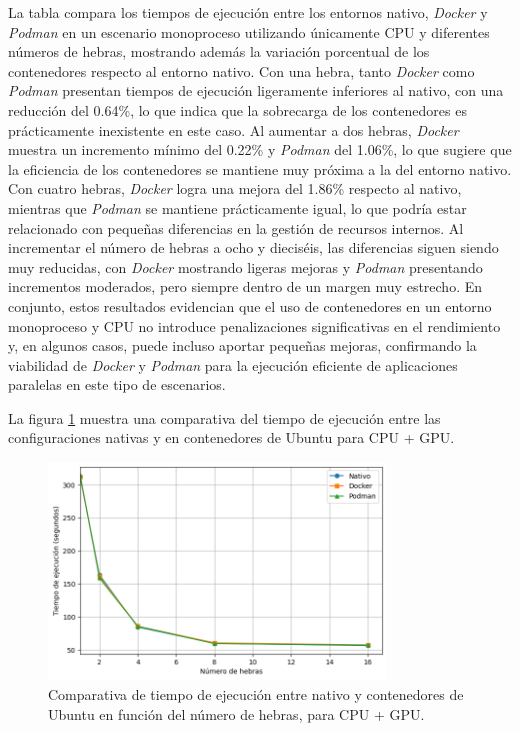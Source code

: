 La tabla compara los tiempos de ejecución entre los entornos nativo, \textit{Docker} y \textit{Podman} en un escenario monoproceso utilizando únicamente CPU y diferentes números de hebras, mostrando además la variación porcentual de los contenedores respecto al entorno nativo. Con una hebra, tanto \textit{Docker} como \textit{Podman} presentan tiempos de ejecución ligeramente inferiores al nativo, con una reducción del 0.64\%, lo que indica que la sobrecarga de los contenedores es prácticamente inexistente en este caso. Al aumentar a dos hebras, \textit{Docker} muestra un incremento mínimo del 0.22\% y \textit{Podman} del 1.06\%, lo que sugiere que la eficiencia de los contenedores se mantiene muy próxima a la del entorno nativo. Con cuatro hebras, \textit{Docker} logra una mejora del 1.86\% respecto al nativo, mientras que \textit{Podman} se mantiene prácticamente igual, lo que podría estar relacionado con pequeñas diferencias en la gestión de recursos internos. Al incrementar el número de hebras a ocho y dieciséis, las diferencias siguen siendo muy reducidas, con \textit{Docker} mostrando ligeras mejoras y \textit{Podman} presentando incrementos moderados, pero siempre dentro de un margen muy estrecho. En conjunto, estos resultados evidencian que el uso de contenedores en un entorno monoproceso y CPU no introduce penalizaciones significativas en el rendimiento y, en algunos casos, puede incluso aportar pequeñas mejoras, confirmando la viabilidad de \textit{Docker} y \textit{Podman} para la ejecución eficiente de aplicaciones paralelas en este tipo de escenarios.

La figura \ref{fig:single-node_ubuntu_container_vs_native_gpu_time} muestra una comparativa del tiempo de ejecución entre las configuraciones nativas y en contenedores de Ubuntu para CPU + GPU.

\begin{figure}[ht]
    \centering
    \includegraphics[width=0.8\textwidth]{imagenes/cap5/single-node_ubuntu_container_vs_native_gpu_time.png}
    \caption{Comparativa de tiempo de ejecución entre nativo y contenedores de Ubuntu en función del número de hebras, para CPU + GPU.}
    \label{fig:single-node_ubuntu_container_vs_native_gpu_time}
\end{figure}

